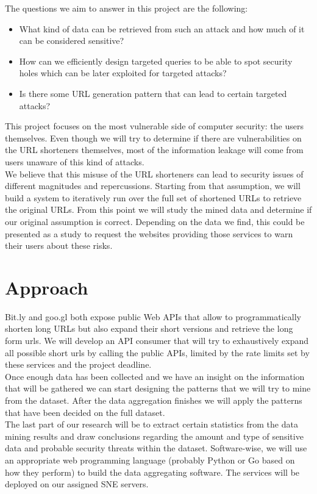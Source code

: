 \documentclass{article}
\begin{document}
The questions we aim to answer in this project are the following:
\begin{itemize}
  \item What kind of data can be retrieved from such an attack and how much of it can be considered sensitive?
  \item How can we efficiently design targeted queries to be able to spot security holes which can be later exploited for targeted attacks?
  \item Is there some URL generation pattern that can lead to certain targeted attacks?
  \end{itemize}
This project focuses on the most vulnerable side of computer security: the users themselves. Even though we will try to determine if there are vulnerabilities on the URL shorteners themselves, most of the information leakage will come from users unaware of this kind of attacks. \\
We believe that this misuse of the URL shorteners can lead to security issues of different magnitudes and repercussions. Starting from that assumption, we will build a system to iteratively run over the full set of shortened URLs to retrieve the original URLs. From this point we will study the mined data and determine if our original assumption is correct. Depending on the data we find, this could be presented as a study to request the websites providing those services to warn their users about these risks.





\section{Approach}
Bit.ly and goo.gl both expose public Web APIs that allow to programmatically shorten long URLs but also expand their short versions and retrieve the long form urls.\cite{bitlyapi}\cite{googleapi} We will develop an API consumer that will try to exhaustively expand all possible short urls by calling the public APIs, limited by the rate limits set by these services and the project deadline. \\
Once enough data has been collected and we have an insight on the information that will be gathered we can start designing the patterns that we will try to mine from the dataset. After the data aggregation finishes we will apply the patterns that have been decided on the full dataset.\\
The last part of our research will be to extract certain statistics from the data mining results and draw conclusions regarding the amount and type of sensitive data and probable security threats within the dataset. 
Software-wise, we will use an appropriate web programming language (probably Python or Go based on how they perform) to build the data aggregating software. The services will be deployed on our assigned SNE servers.\\
\newpage
\end{document}
